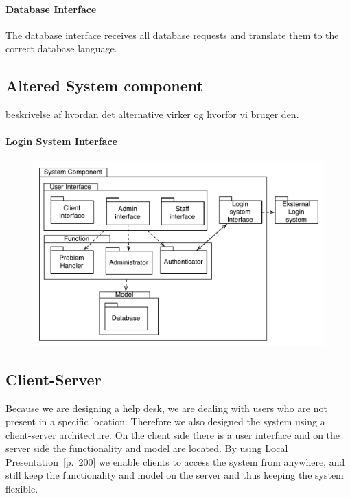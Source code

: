 \paragraph{Database Interface}
The database interface receives all database requests and translate them to the correct database language.


\subsection{Altered System component}


beskrivelse af hvordan det alternative virker og hvorfor vi bruger den.

\paragraph{Login System Interface}


\begin{figure}[]
	\centering
	\includegraphics[scale=0.5]{input/architectural_design/system_component_denalternative.pdf}
	\morscaption{}
	\label{fig:SystemComponent}
\end{figure}


\subsection{Client-Server}
Because we are designing a help desk, we are dealing with users who are not present in a specific location. Therefore we also designed the system using a client-server architecture.
On the client side there is a user interface and on the server side the functionality and model are located. By using Local Presentation~\cite{roedeaalborg}[p.~200] we enable clients to access the system from anywhere, and still keep the functionality and model on the server and thus keeping the system flexible.         

